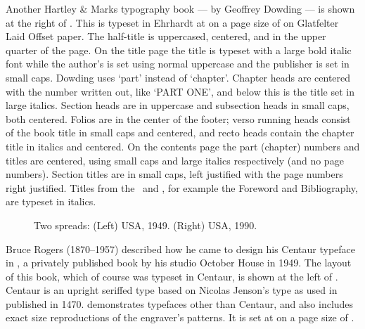 \documentclass[10pt,letterpaper,extrafontsizes]{memoir}
\begin{document}
Another Hartley \& Marks
typography book ---  by Geoffrey Dowding --- 
is shown at the right of .
This is typeset in Ehrhardt at  on a page 
size of  on Glatfelter Laid 
Offset paper. 
The half-title is uppercased,
centered, and in the upper quarter of the page. On the title 
page the title is typeset with a large bold italic font 
while the author's is set using normal uppercase and the publisher
is set in small caps. Dowding uses `part' instead of `chapter'. 
Chapter heads are centered with the number written 
out, like `PART ONE', and below this is the title set in large italics.
Section heads are in uppercase and subsection heads in 
small caps, both centered. Folios are in the center of the 
footer; verso running heads
consist of the book title in small caps and centered, and recto heads
contain the chapter title in italics and centered. On the 
contents page the part (chapter) numbers and titles
are centered, using small caps and large italics respectively (and no page
numbers). Section titles are in small caps, left justified with the
page numbers right justified. Titles from the \pixfrontmatter\ 
and \pixbackmatter, for example the Foreword and 
Bibliography, are typeset in italics.



\begin{figure}
\centering
\begin{minipage}[b]{\pwlayi}
\end{minipage}
\hfill
\begin{minipage}[b]{\pwlayi}
\end{minipage}
\caption[Two spreads: USA, 1949 and 1990]%
        {Two spreads: (Left) USA, 1949.
         (Right) USA, 1990.} \label{fb:4}
\end{figure}

    Bruce Rogers (1870--1957) 
described how he came to design his Centaur typeface in
\btitle{Centaur Types}, a privately published book by his studio October
House in 1949. The layout of this book, which of course was typeset in
Centaur, is shown at the left of \fref{fb:4}. Centaur is an upright
seriffed type based on Nicolas Jenson's\index{Jenson, Nicolas} type as 
used in \btitle{Eusebius} published in 1470. 
 demonstrates typefaces other than
Centaur, and also includes exact size reproductions of the engraver's 
patterns. It is set at \abyb{14/16}{22} on a page size of .
\end{document}
